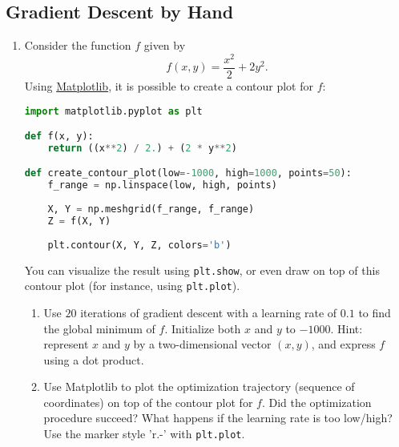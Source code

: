 \documentclass[a4paper,11pt]{article}
\begin{document}
\subsection{Gradient Descent by Hand}
\begin{enumerate}
 \item Consider the function $f$ given by
 \begin{equation*}
  f(x, y) = \frac{x^2}{2} + 2y^2.
 \end{equation*}
 Using \href{https://matplotlib.org/users/pyplot_tutorial.html}{Matplotlib}, it is possible to create a contour plot for $f$:
 \begin{lstlisting}[language=Python, frame=tb, caption=Contour plot using Matplotlib.]
import matplotlib.pyplot as plt

def f(x, y):
    return ((x**2) / 2.) + (2 * y**2)

def create_contour_plot(low=-1000, high=1000, points=50):
    f_range = np.linspace(low, high, points)
    
    X, Y = np.meshgrid(f_range, f_range)
    Z = f(X, Y)
    
    plt.contour(X, Y, Z, colors='b')
 \end{lstlisting}

You can visualize the result using \texttt{plt.show}, or even draw on top of this contour plot (for instance, using \texttt{plt.plot}).
 
 \begin{enumerate}
    \item Use $20$ iterations of gradient descent with a learning rate of $0.1$ to find the global minimum of $f$. Initialize both $x$ and $y$ to $-1000$. Hint: represent $x$ and $y$ by a two-dimensional vector $(x, y)$,
and express $f$ using a dot product.
    \item Use Matplotlib to plot the optimization trajectory (sequence of coordinates) on top of the contour plot for $f$. Did the optimization procedure succeed? What happens if the learning rate is too low/high? Use the marker style 'r.-' with \texttt{plt.plot}.
 \end{enumerate}


\end{enumerate}
\end{document}
